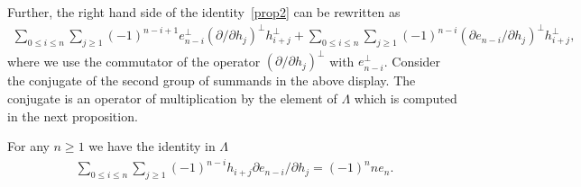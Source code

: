 \documentclass[pdftex]{sigma}
\numberwithin{equation}{section}
\renewcommand\ge{\geqslant}
\renewcommand\le{\leqslant}
\begin{document}
Further, the right hand side of the identity~\eqref{prop2} can be rewritten as
\begin{gather*}
\sum_{0\le i\le n}\sum_{j\ge1}(-1)^{n-i+1}e_{n-i}^{\perp}(\partial /\partial h_j)^{\perp}
h_{i+j}^{\perp}+\sum_{0\le i\le n}\sum_{j\ge1}(-1)^{n-i}(\partial e_{n-i}/\partial h_j)^{\perp}h_{i+j}^{\perp},
\end{gather*}
where we use the commutator of the operator $(\partial /\partial
h_j)^{\perp}$ with $e_{ n-i}^{\perp}$.
Consider the conjugate of the second group of summands in the above display.
The conjugate is an operator of multiplication by the element of $\Lambda$ which is computed in the next
proposition.
\begin{proposition}\label{Prop3}
For any $n\ge1$ we have the identity in $\Lambda$
\begin{gather}
\label{prop3}
\sum_{0\le i\le n}\sum_{j\ge1}(-1)^{n-i}h_{i+j}
\partial e_{n-i}/\partial
h_j=(-1)^nne_n.
\end{gather}
\end{proposition}
\end{document}
